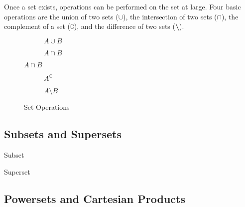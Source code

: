 \documentclass[12pt]{article}
\begin{document}
Once a set exists, operations can be performed on the set at large. Four basic operations
are the union of two sets ($\cup$), the intersection of two sets ($\cap$), the complement
of a set ($\complement$), and the difference of two sets (\textbf{\textbackslash}).

\begin{figure}[H]
  \centering
  \begin{subfigure}[H]{0.45\textwidth}
    \centering
    
    \caption{$A \cup B$}
    \label{fig:setUnion}
  \end{subfigure}
  \begin{subfigure}[H]{0.45\textwidth}
    \centering
    
    \caption{$A \cap B$}
    \label{fig:setIntersection}
  \end{subfigure}
\end{figure}
\begin{figure}[H]
  \centering
  \begin{subfigure}[H]{0.45\textwidth}
    \centering
    
    \caption{$A^{\mathbb{C}}$}
    \label{fig:setComplement}
  \end{subfigure}
  \begin{subfigure}[H]{0.45\textwidth}
    \centering
    
    \caption{$A \textbf{\textbackslash} B$}
    \label{fig:setDifference}
  \end{subfigure}
  \caption{Set Operations}
  \label{fig:setOperations}
\end{figure}

\subsection{Subsets and Supersets}
\label{ssec:subsetsAndSupersets}

\begin{definition}{Subset}
  
\end{definition}

\begin{definition}{Superset}
  
\end{definition}

\subsection{Powersets and Cartesian Products}
\label{ssec:powersetsAndCartesianProducts}
\end{document}

